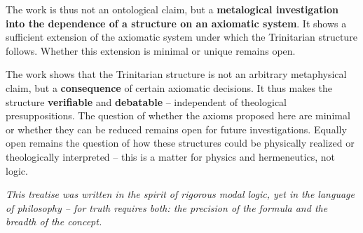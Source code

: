 \documentclass[
]{article}
\begin{document}
The work is thus not an ontological claim, but a \textbf{metalogical investigation into the dependence of a structure on an axiomatic system}. It shows a sufficient extension of the axiomatic system under which the Trinitarian structure follows. Whether this extension is minimal or unique remains open.

The work shows that the Trinitarian structure is not an arbitrary metaphysical claim, but a \textbf{consequence} of certain axiomatic decisions. It thus makes the structure \textbf{verifiable} and \textbf{debatable} – independent of theological presuppositions. The question of whether the axioms proposed here are minimal or whether they can be reduced remains open for future investigations. Equally open remains the question of how these structures could be physically realized or theologically interpreted – this is a matter for physics and hermeneutics, not logic.

\begin{center}
\emph{This treatise was written in the spirit of rigorous modal logic, yet in the language of philosophy – for truth requires both: the precision of the formula and the breadth of the concept.}
\end{center}
\end{document}
